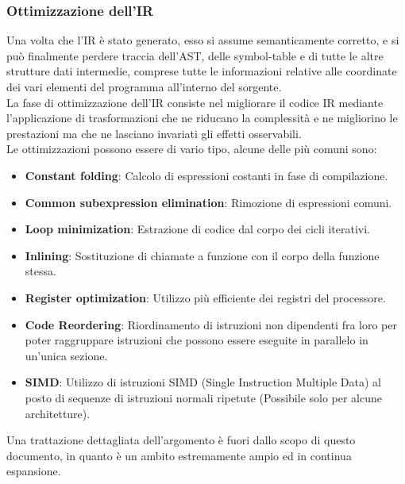 \subsubsection{Ottimizzazione dell'IR}
Una volta che l'IR è stato generato, esso si assume semanticamente corretto, e si può finalmente perdere traccia 
dell'AST, delle symbol-table e di tutte le altre strutture dati intermedie, comprese tutte le informazioni relative 
alle coordinate dei vari elementi del programma all'interno del sorgente. \\


La fase di ottimizzazione dell'IR consiste nel migliorare il codice IR mediante l'applicazione di trasformazioni
che ne riducano la complessità e ne migliorino le prestazioni ma che ne lasciano invariati gli effetti osservabili. \\

Le ottimizzazioni possono essere di vario tipo, alcune delle più comuni sono:

\begin{itemize}
    \item \textbf{Constant folding}: Calcolo di espressioni costanti in fase di compilazione.
    
    \item \textbf{Common subexpression elimination}: Rimozione di espressioni comuni.
    
    \item \textbf{Loop minimization}: Estrazione di codice dal corpo dei cicli iterativi.
    
    \item \textbf{Inlining}: Sostituzione di chiamate a funzione con il corpo della funzione stessa.
    
    \item \textbf{Register optimization}: Utilizzo più efficiente dei registri del processore.

    \item \textbf{Code Reordering}: Riordinamento di istruzioni non dipendenti fra loro per
    poter raggruppare istruzioni che possono essere eseguite in parallelo in un'unica sezione.
    
    \item \textbf{SIMD}: Utilizzo di istruzioni SIMD (Single Instruction Multiple Data) al 
    posto di sequenze di istruzioni normali ripetute (Possibile solo per alcune architetture). 
\end{itemize}

Una trattazione dettagliata dell'argomento è fuori dallo scopo di questo documento, in quanto è un 
ambito estremamente ampio ed in continua espansione. \\